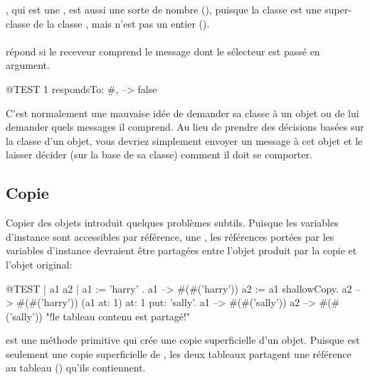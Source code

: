 \documentclass[a4paper,10pt,twoside]{book}
\begin{document}
, qui est une , est aussi une sorte de nombre (), puisque la classe  est une super-classe de la classe , mais  n'est pas un entier ().

\paragraph{}
 r\'epond  si le receveur comprend le message dont le s\'electeur est pass\'e en argument.

\begin{code}{@TEST}
1 respondsTo: #, --> false
\end{code}

C'est normalement une mauvaise id\'ee de demander sa classe \`a un
objet ou de lui demander quels messages il comprend.
Au lieu de prendre des d\'ecisions bas\'ees sur la classe d'un objet, vous devriez simplement envoyer un message \`a cet objet et le laisser d\'ecider (\ie sur la base de sa classe) comment il doit se comporter.

\subsection{Copie}

Copier des objets introduit quelques probl\`emes subtils. Puisque les variables d'instance sont accessibles par r\'ef\'erence, une , les r\'ef\'erences port\'ees par les variables d'instance devraient \^etre partag\'ees entre l'objet produit par la copie et l'objet original:

\begin{code}{@TEST | a1 a2 |}
a1 := { { 'harry' } }.
a1 --> #(#('harry'))
a2 := a1 shallowCopy.
a2 --> #(#('harry'))
(a1 at: 1) at: 1 put: 'sally'.
a1 --> #(#('sally'))
a2 --> #(#('sally'))    "!le tableau contenu est partag\'e!"
\end{code}

 est une m\'ethode primitive qui cr\'ee une copie superficielle d'un objet. Puisque  est seulement une copie superficielle de , les deux tableaux partagent une r\'ef\'erence au tableau () qu'ils contiennent.
\end{document}
